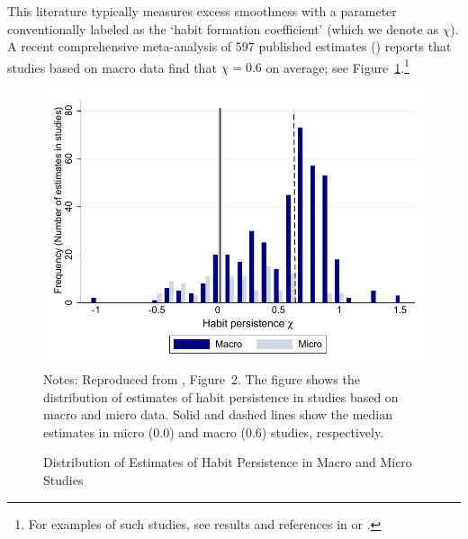 \documentclass[titlepage]{\econtex}\newcommand{\texname}{cAndCwithStickyE}
\begin{document}
This literature typically measures excess smoothness with a parameter conventionally labeled as the `habit formation coefficient' (which we denote as $\chi$). A recent comprehensive meta-analysis of 597 published estimates (\cite{hrsHabit}) reports that studies based on macro data find that $\chi=0.6$ on average; see Figure~\ref{microMacroMetaHistogram}.\footnote{For examples of such studies, see results and references in \cite{fuhrer:habits} or \cite{cee:habits}.}

\begin{figure}
\caption{Distribution of Estimates of Habit Persistence in Macro and Micro Studies}
\label{microMacroMetaHistogram}
{ \includegraphics[width=1.0\textwidth]{./Figures/microMacroMetaHistogram}}
\footnotesize Notes: Reproduced from \cite{hrsHabit}, Figure~2. The figure shows the distribution of estimates of habit persistence in studies based on macro and micro data. Solid and dashed lines show the median estimates in micro (0.0) and macro (0.6) studies, respectively.
\end{figure}
\end{document}
